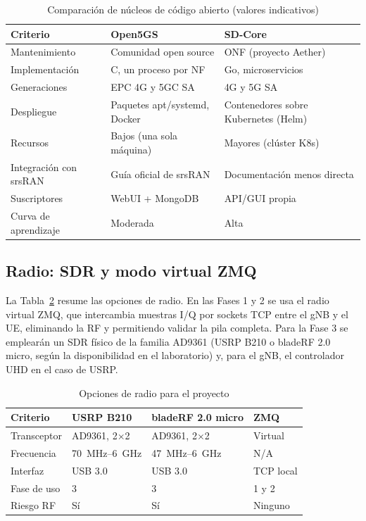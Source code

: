 \documentclass[conference]{IEEEtran}
\begin{document}
\begin{table}[!t]
\caption{Comparación de núcleos de código abierto (valores indicativos)}
\label{tab:core}
\centering
\footnotesize
\renewcommand{\arraystretch}{1.15}
\begin{tabular}{p{1.7cm}p{3.1cm}p{3.1cm}}
\toprule
\textbf{Criterio} & \textbf{Open5GS} & \textbf{SD-Core} \\
\midrule
Mantenimiento & Comunidad open source & ONF (proyecto Aether) \\
Implementación & C, un proceso por NF & Go, microservicios \\
Generaciones & EPC 4G y 5GC SA & 4G y 5G SA \\
Despliegue & Paquetes apt/systemd, Docker & Contenedores sobre Kubernetes (Helm) \\
Recursos & Bajos (una sola máquina) & Mayores (clúster K8s) \\
Integración con srsRAN & Guía oficial de srsRAN & Documentación menos directa \\
Suscriptores & WebUI + MongoDB & API/GUI propia \\
Curva de aprendizaje & Moderada & Alta \\
\bottomrule
\end{tabular}
\end{table}

\subsection{Radio: SDR y modo virtual ZMQ}
La Tabla~\ref{tab:sdr} resume las opciones de radio. En las Fases 1 y 2 se usa el radio virtual ZMQ, que intercambia muestras I/Q por sockets TCP entre el gNB y el UE, eliminando la RF y permitiendo validar la pila completa. Para la Fase 3 se emplearán un SDR físico de la familia AD9361 (USRP B210 o bladeRF 2.0 micro, según la disponibilidad en el laboratorio) y, para el gNB, el controlador UHD en el caso de USRP.

\begin{table}[!t]
\caption{Opciones de radio para el proyecto}
\label{tab:sdr}
\centering
\footnotesize
\renewcommand{\arraystretch}{1.15}
\begin{tabular}{p{1.5cm}p{2.0cm}p{2.0cm}p{1.5cm}}
\toprule
\textbf{Criterio} & \textbf{USRP B210} & \textbf{bladeRF 2.0 micro} & \textbf{ZMQ} \\
\midrule
Transceptor & AD9361, 2$\times$2 & AD9361, 2$\times$2 & Virtual \\
Frecuencia & 70~MHz--6~GHz & 47~MHz--6~GHz & N/A \\
Interfaz & USB 3.0 & USB 3.0 & TCP local \\
Fase de uso & 3 & 3 & 1 y 2 \\
Riesgo RF & Sí & Sí & Ninguno \\
\bottomrule
\end{tabular}
\end{table}
\end{document}

